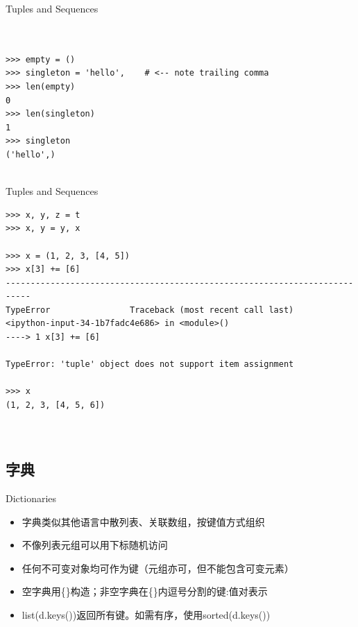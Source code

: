 \documentclass{beamer}
\begin{document}
\begin{frame}[t,fragile]{Tuples and Sequences}


\begin{verbatim}


>>> empty = ()
>>> singleton = 'hello',    # <-- note trailing comma
>>> len(empty)
0
>>> len(singleton)
1
>>> singleton
('hello',)


\end{verbatim}


\end{frame}



\begin{frame}[t,fragile]{Tuples and Sequences}


    \scriptsize
\begin{verbatim}
>>> x, y, z = t
>>> x, y = y, x

>>> x = (1, 2, 3, [4, 5])
>>> x[3] += [6]
---------------------------------------------------------------------------
TypeError                Traceback (most recent call last)
<ipython-input-34-1b7fadc4e686> in <module>()
----> 1 x[3] += [6]

TypeError: 'tuple' object does not support item assignment

>>> x
(1, 2, 3, [4, 5, 6])



\end{verbatim}


\end{frame}


\subsection{字典}
\label{sub:字典}

\begin{frame}[t]{Dictionaries}

    \begin{itemize}
        \item 字典类似其他语言中散列表、关联数组，按键值方式组织
        \item 不像列表元组可以用下标随机访问
        \item 任何不可变对象均可作为键（元组亦可，但不能包含可变元素）
        \item 空字典用\{\}构造；非空字典在\{\}内逗号分割的键:值对表示
        \item list(d.keys())返回所有键。如需有序，使用sorted(d.keys())
    \end{itemize}

\end{frame}
\end{document}
